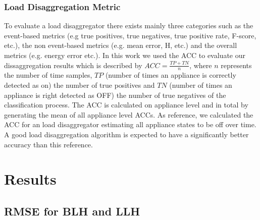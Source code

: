 \documentclass{article}
\begin{document}
\subsubsection{Load Disaggregation Metric}
To evaluate a load disaggregator there exists mainly three categories such as the event-based metrics (e.g true positives, true negatives, true positive rate, F-score, etc.), the non event-based metrics (e.g. mean error, \ac{H}, etc.) and the overall metrics (e.g. energy error etc.).
In this work we used the \ac{ACC} to evaluate our dissaggregation results which is described by
$ACC = \frac{TP+TN}{n}$, where $n$ represents the number of time samples, $TP$ (number of times an appliance is correctly detected as on) the number of true positives and $TN$ (number of times an appliance is right detected as OFF) the number of true negatives of the classification process.
The \ac{ACC} is calculated on appliance level and in total by generating the mean of all appliance level \acp{ACC}.
As reference, we calculated the \ac{ACC} for an load disaggregator estimating all appliance states to be off over time. 
A good load disaggregation algorithm is expected to have a significantly better accuracy than this reference.




\section{Results}\label{sec:results}
\subsection{RMSE for \ac{BLH} and \ac{LLH}}
\end{document}

